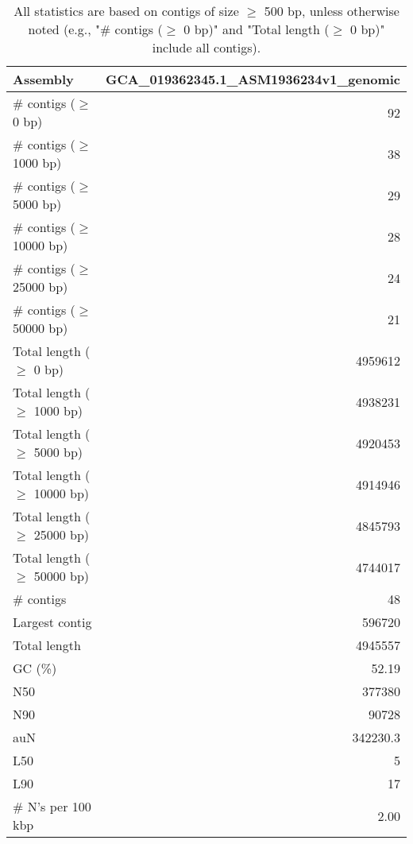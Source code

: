 \documentclass[12pt,a4paper]{article}
\begin{document}
\begin{table}[ht]
\begin{center}
\caption{All statistics are based on contigs of size $\geq$ 500 bp, unless otherwise noted (e.g., "\# contigs ($\geq$ 0 bp)" and "Total length ($\geq$ 0 bp)" include all contigs).}
\begin{tabular}{|l*{1}{|r}|}
\hline
Assembly & GCA\_019362345.1\_ASM1936234v1\_genomic \\ \hline
\# contigs ($\geq$ 0 bp) & 92 \\ \hline
\# contigs ($\geq$ 1000 bp) & 38 \\ \hline
\# contigs ($\geq$ 5000 bp) & 29 \\ \hline
\# contigs ($\geq$ 10000 bp) & 28 \\ \hline
\# contigs ($\geq$ 25000 bp) & 24 \\ \hline
\# contigs ($\geq$ 50000 bp) & 21 \\ \hline
Total length ($\geq$ 0 bp) & 4959612 \\ \hline
Total length ($\geq$ 1000 bp) & 4938231 \\ \hline
Total length ($\geq$ 5000 bp) & 4920453 \\ \hline
Total length ($\geq$ 10000 bp) & 4914946 \\ \hline
Total length ($\geq$ 25000 bp) & 4845793 \\ \hline
Total length ($\geq$ 50000 bp) & 4744017 \\ \hline
\# contigs & 48 \\ \hline
Largest contig & 596720 \\ \hline
Total length & 4945557 \\ \hline
GC (\%) & 52.19 \\ \hline
N50 & 377380 \\ \hline
N90 & 90728 \\ \hline
auN & 342230.3 \\ \hline
L50 & 5 \\ \hline
L90 & 17 \\ \hline
\# N's per 100 kbp & 2.00 \\ \hline
\end{tabular}
\end{center}
\end{table}
\end{document}
